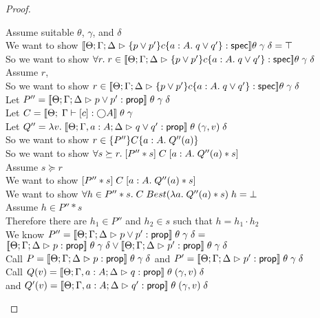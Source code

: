 \begin{proof}
\begin{tabbedproof}
    \oo Assume suitable $\theta$, $\gamma$, and $\delta$ \\
    \ooo We want to show $\interp{\judgeS{\spec{p \vee p'}{c}{a:A}{q \vee q'}}}\theta\;\gamma\;\delta = \top$ \\
    \ooo So we want to show $\forall r.\; r \in \interp{\judgeS{\spec{p \vee p'}{c}{a:A}{q \vee q'}}}\theta\;\gamma\;\delta$ \\
    \ooo Assume $r$, \\
    \oooo So we want to show $r \in\interp{\judgeS{\spec{p \vee p'}{c}{a:A}{q \vee q'}}}\theta\;\gamma\;\delta$ \\
    \oooo Let $P'' = \interp{\judgeA{p \vee p'}{\assert}}\;\theta\;\gamma\;\delta$ \\
    \oooo Let $C = \interp{\judgeE{\Gamma}{[c]}{\monad{A}}}\;\theta\;\gamma$ \\
    \oooo Let $Q'' = \semfun{v}{\interp{\judgeA[\Theta; \Gamma,a:A; \Delta]{q \vee q'}{\assert}}\;\theta\;(\gamma, v)\;\delta}$ \\
    \oooo So we want to show $r \in \spec{P''}{C}{a:A}{Q''(a)}$ \\
    \oooo So we want to show $\forall s \succeq r.\; \basicspec{P'' * s}{C}{a:A}{Q''(a) * s}$ \\
    \oooo Assume $s \succeq r$ \\
    \ooooo We want to show $\basicspec{P'' * s}{C}{a:A}{Q''(a) * s}$ \\
    \ooooo We want to show $\forall h \in P'' * s.\; C\;Best(\semfun{a}{Q''(a) * s})\;h = \bot$ \\
    \ooooo Assume $h \in P'' * s$ \\
    \oooooo Therefore there are $h_1 \in P''$ and $h_2 \in s$ such that $h = h_1 \cdot h_2$ \\
    \oooooo We know $P'' = \interp{\judgeA{p \vee p'}{\assert}}\;\theta\;\gamma\;\delta = $\\
    \oooooox $\interp{\judgeA{p}{\assert}}\;\theta\;\gamma\;\delta \vee 
                           \interp{\judgeA{p'}{\assert}}\;\theta\;\gamma\;\delta$ \\ 
    \oooooo Call $P = \interp{\judgeA{p}{\assert}}\;\theta\;\gamma\;\delta$ and $P' = \interp{\judgeA{p'}{\assert}}\;\theta\;\gamma\;\delta$ \\
    \oooooo Call $Q(v) = \interp{\judgeA[\Theta; \Gamma, a:A; \Delta]{q}{\assert}}\;\theta\;(\gamma,v)\;\delta$ \\
    \ooooox and $Q'(v) = \interp{\judgeA[\Theta; \Gamma, a:A; \Delta]{q'}{\assert}}\;\theta\;(\gamma,v)\;\delta$ \\

\end{tabbedproof}
\end{proof}
